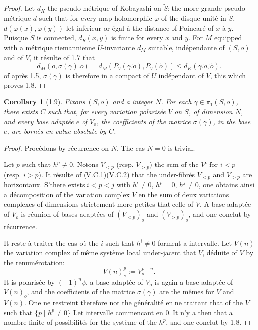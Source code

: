 \documentclass[12pt,a4paper]{article}
\theoremstyle{plain}
\newtheorem{corollary}{Corollary}[section]
\theoremstyle{definition}
\begin{document}
{\begin{proof}
Let $d_{K}$ the pseudo-m\'{e}trique of Kobayashi on $\widetilde{S}$: the more grande pseudo-m\'{e}trique $d$ such that for every map holomorphic $\varphi$ of the disque unit\'{e} in $\widetilde{S}$, $d(\varphi(x), \varphi(y))$ let inf\'{e}rieur or \'{e}gal \`{a} the distance of Poincar\'{e} of $x$ \`{a} $y$. Puisque $\widetilde{S}$ is connected, $d_{K}(x,y)$ is finite for every $x$ and $y$. For $M$ equipped with a m\'{e}trique riemannienne $U$-invariante $d_{M}$ suitable, ind\'{e}pendante of $(S,o)$ and of $V$, it r\'{e}sulte of 1.7 that
\[
d_{M}(o, \sigma(\gamma).o) = d_{M}(P_{V}(\gamma.\tilde{o}), P_{V}(\tilde{o})) \leq d_{K}(\gamma.\tilde{o}, \tilde{o}).
\]
of apr\`{e}s 1.5, $\sigma(\gamma)$ is therefore in a compact of $U$ ind\'{e}pendant of $V$, this which proves 1.8.
\end{proof}

\begin{corollary}[1.9]
Fixons $(S,o)$ and a integer $N$. For each $\gamma \in \pi_{1}(S,o)$, there exists $C$ such that, for every variation polaris\'{e}e $V$ on $S$, of dimension $N$, and every base adapt\'{e}e $e$ of $V_{o}$, the coefficients of the matrice $\sigma(\gamma)$, in the base $e$, are born\'{e}s en value absolute by $C$.
\end{corollary}

\begin{proof}
Proc\'{e}dons by r\'{e}currence on $N$. The cas $N = 0$ is trivial.

Let $p$ such that $h^{p} \neq 0$. Notons $V_{<p}$ (resp. $V_{>p}$) the sum of the $V^{i}$ for $i < p$ (resp. $i > p$). It r\'{e}sulte of (V.C.1)(V.C.2) that the under-fibr\'{e}s $V_{<p}$ and $V_{>p}$ are horizontaux. S'there exists $i < p < j$ with $h^{i} \neq 0$, $h^{p} = 0$, $h^{j} \neq 0$, one obtains ainsi a d\'{e}composition of the variation complex $V$ en the sum of deux variations complexes of dimensions strictement more petites that celle of $V$. A base adapt\'{e}e of $V_{o}$ is r\'{e}union of bases adapt\'{e}es of $(V_{<p})_{o}$ and $(V_{>p})_{o}$, and one conclut by r\'{e}currence.

It reste \`{a} traiter the cas o\`{u} the $i$ such that $h^{i} \neq 0$ forment a intervalle. Let $V(n)$ the variation complex of m\^{e}me syst\`{e}me local under-jacent that $V$, d\'{e}duite of $V$ by the renum\'{e}rotation:
\[
V(n)_{s}^{p} := V_{s}^{p+n}.
\]
It is polaris\'{e}e by $(-1)^{n}\psi$, a base adapt\'{e}e of $V_{o}$ is again a base adapt\'{e}e of $V(n)_{o}$, and the coefficients of the matrice $\sigma(\gamma)$ are the m\^{e}mes for $V$ and $V(n)$. One ne restreint therefore not the g\'{e}n\'{e}ralit\'{e} en ne traitant that of the $V$ such that $\{p \mid h^{p} \neq 0\}$ Let intervalle commencant en $0$. It n'y a then that a nombre finite of possibilit\'{e}s for the syst\`{e}me of the $h^{p}$, and one conclut by 1.8.
\end{proof}

}
\end{document}
